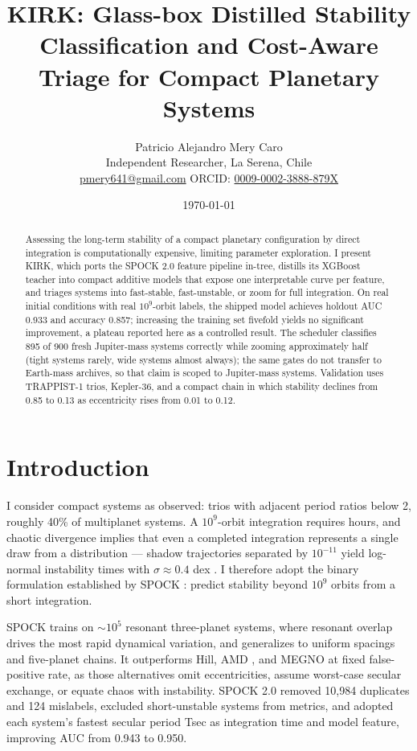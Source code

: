 \documentclass[11pt]{article}
\title{KIRK: Glass-box Distilled Stability Classification and Cost-Aware Triage for Compact Planetary Systems}
\author{Patricio Alejandro Mery Caro \\
  {\small Independent Researcher, La Serena, Chile} \\
  {\small \href{mailto:pmery641@gmail.com}{pmery641@gmail.com} \quad
  ORCID: \href{https://orcid.org/0009-0002-3888-879X}{0009-0002-3888-879X}}}
\date{\today}
\begin{document}
\linenumbers
\maketitle
\begin{abstract}
Assessing the long-term stability of a compact planetary configuration by direct integration is computationally expensive, limiting parameter exploration. I present KIRK, which ports the SPOCK 2.0 feature pipeline in-tree, distills its XGBoost teacher into compact additive models that expose one interpretable curve per feature, and triages systems into fast-stable, fast-unstable, or zoom for full integration. On real initial conditions with real $10^9$-orbit labels, the shipped model achieves holdout AUC 0.933 and accuracy 0.857; increasing the training set fivefold yields no significant improvement, a plateau reported here as a controlled result. The scheduler classifies 895 of 900 fresh Jupiter-mass systems correctly while zooming approximately half (tight systems rarely, wide systems almost always); the same gates do not transfer to Earth-mass archives, so that claim is scoped to Jupiter-mass systems. Validation uses TRAPPIST-1 trios, Kepler-36, and a compact chain in which stability declines from 0.85 to 0.13 as eccentricity rises from 0.01 to 0.12.
\end{abstract}

\section{Introduction}
I consider compact systems as observed: trios with adjacent period ratios below 2, roughly 40\% of multiplanet systems. A $10^9$-orbit integration requires hours, and chaotic divergence implies that even a completed integration represents a single draw from a distribution --- shadow trajectories separated by $10^{-11}$ yield log-normal instability times with $\sigma\approx0.4$ dex \citep{Hussain2020}. I therefore adopt the binary formulation established by SPOCK \citep{Tamayo2020}: predict stability beyond $10^9$ orbits from a short integration.

SPOCK trains on $\sim$$10^5$ resonant three-planet systems, where resonant overlap drives the most rapid dynamical variation, and generalizes to uniform spacings and five-planet chains. It outperforms Hill, AMD \citep{Laskar2017}, and MEGNO \citep{Cincotta2003} at fixed false-positive rate, as those alternatives omit eccentricities, assume worst-case secular exchange, or equate chaos with instability. SPOCK 2.0 \citep{Thadhani2025} removed 10,984 duplicates and 124 mislabels, excluded short-unstable systems from metrics, and adopted each system's fastest secular period Tsec \citep{Yang2024} as integration time and model feature, improving AUC from 0.943 to 0.950.
\end{document}
